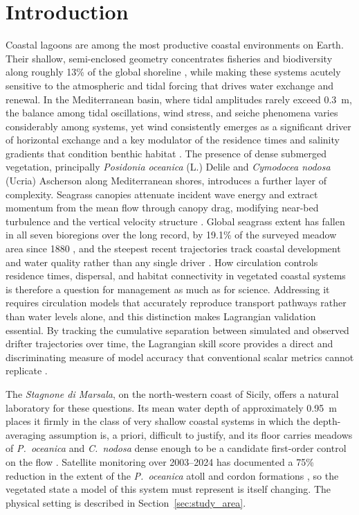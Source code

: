 \section{Introduction}
\label{sec:introduction}

Coastal lagoons are among the most productive coastal environments on Earth.
Their shallow, semi-enclosed geometry concentrates fisheries and biodiversity
along roughly 13\% of the global shoreline \citep{Carrasco2016, Kjerfve1994},
while making these systems acutely sensitive to the atmospheric and tidal
forcing that drives water exchange and renewal. In the Mediterranean basin,
where tidal amplitudes rarely exceed 0.3~m, the balance among tidal
oscillations, wind stress, and seiche phenomena varies considerably among
systems, yet wind consistently emerges as a significant driver of horizontal
exchange and a key modulator of the residence times and salinity gradients
that condition benthic habitat \citep{Niedda2007, Umgiesser2014}. The presence
of dense submerged vegetation, principally \emph{Posidonia oceanica} (L.)
Delile and \emph{Cymodocea nodosa} (Ucria) Ascherson along Mediterranean
shores, introduces a further layer of complexity. Seagrass canopies attenuate
incident wave energy \citep{Infantes2012} and extract momentum from the mean
flow through canopy drag, modifying near-bed turbulence and the vertical
velocity structure \citep{Nepf2012}. Global seagrass extent has fallen in all
seven bioregions over the long record, by 19.1\% of the surveyed meadow area
since 1880 \citep{Waycott2009, Dunic2021}, and the steepest recent
trajectories track coastal development and water quality rather than any
single driver \citep{Turschwell2021}. How circulation controls residence
times, dispersal, and habitat connectivity in vegetated coastal systems is
therefore a question for management as much as for science. Addressing it
requires circulation models that accurately reproduce
transport pathways rather than water levels alone, and this distinction makes
Lagrangian validation essential. By tracking the cumulative separation between
simulated and observed drifter trajectories over time, the Lagrangian skill
score provides a direct and discriminating measure of model accuracy that
conventional scalar metrics cannot replicate
\citep{Liu2011, Revelard2021}.

The \emph{Stagnone di Marsala}, on the north-western coast of Sicily, offers a
natural laboratory for these questions. Its mean water depth of approximately
0.95~m places it firmly in the class of very shallow coastal systems in which
the depth-averaging assumption is, a priori, difficult to justify, and its
floor carries meadows of \emph{P.\ oceanica} and \emph{C.\ nodosa} dense enough
to be a candidate first-order control on the flow
\citep{DeMarchis2012, Ciraolo2009a}. Satellite monitoring over 2003--2024 has
documented a 75\% reduction in the extent of the \emph{P.\ oceanica} atoll and
cordon formations \citep{Maltese2025}, so the vegetated state a model of this
system must represent is itself changing. The physical setting is described in
Section~\ref{sec:study_area}.

